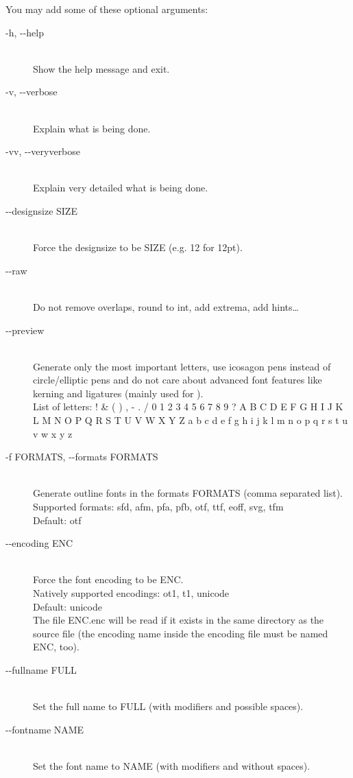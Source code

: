 \documentclass{scrartcl}
\begin{document}
You may add some of these optional arguments:
\begin{description}
	\item[-h, -{}-help] \hfill \\
		Show the help message and exit.
	\item[-v, -{}-verbose ] \hfill \\
		Explain what is being done.
	\item[-vv, -{}-veryverbose] \hfill \\
		Explain very detailed what is being done.
	\item[-{}-designsize SIZE] \hfill \\
		Force the designsize to be SIZE (e.g. 12 for 12pt).
	\item[-{}-raw] \hfill \\
		Do not remove overlaps, round to int, add extrema, add hints\ldots
	\item[-{}-preview  ] \hfill \\
		Generate only the most important letters, use icosagon pens instead of circle/elliptic pens and do not care about advanced font features like kerning and ligatures (mainly used for ).\\
		List of letters: ! \& ( ) , - . / 0 1 2 3 4 5 6 7 8 9 ? A B C D E F G H I J K L M N O P Q R S T U V W X Y Z a b c d e f g h i j k l m n o p q r s t u v w x y z 
	\item[-f FORMATS, -{}-formats FORMATS] \hfill \\
		Generate outline fonts in the formats FORMATS (comma separated list).\\
		Supported formats: sfd, afm, pfa, pfb, otf, ttf, eoff, svg, tfm\\
		Default: otf
	\item[-{}-encoding ENC ] \hfill \\
		Force the font encoding to be ENC.\\
		Natively supported encodings: ot1, t1, unicode\\
		Default: unicode\\
		The file ENC.enc will be read if it exists in the same directory as the source file (the encoding name inside the encoding file must be named ENC, too).
	\item[-{}-fullname FULL] \hfill \\
		Set the full name to FULL (with modifiers and possible spaces).
	\item[-{}-fontname NAME] \hfill \\
		Set the font name to NAME (with modifiers and without spaces).

\end{description}
\end{document}
